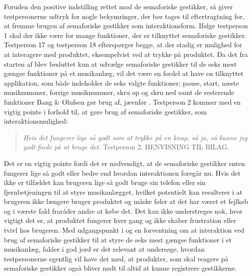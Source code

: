 Foruden den positive indstilling rettet mod de semaforiske gestikker, så giver testpersonerne udtryk for nogle bekymringer, der bør tages til eftertragtning for, at fremme brugen af semaforiske gestikker som interaktionsform. Ifølge testperson 1 skal der ikke være for mange funktioner, der er tilknyttet semaforiske gestikker. Testperson 17 og testperson 18 efterspørger begge, at der stadig er mulighed for at interagere med produktet, eksempelvist ved at trykke på produktet. Da det fra starten af blev besluttet kun at udvælge semaforiske gestikker til de seks mest gængse funktioner på et musikanlæg, vil det være en fordel at have en tilknyttet applikation, som både indeholder de seks valgte funktioner; pause, start, næste musiknummer, forrige musiknummer, skru op og skru ned samt de resterende funktioner Bang $\&$ Olufsen gør brug af, jævnfør .\blankline
% 
Testperson 2 kommer med en vigtig pointe i forhold til, at gøre brug af semaforiske gestikker, som interaktionsmulighed: 
%
\begin{quotation}
\textit{Hvis det fungerer lige så godt som at trykke på en knap, så ja, så kunne jeg godt finde på at bruge det.} Testperson 2, HENVISNING TIL BILAG. 
\end{quotation}
%
Det er en vigtig pointe fordi det er nødvendigt, at de semaforiske gestikker enten fungerer lige så godt eller bedre end hvordan interaktionen foregår nu. Hvis det ikke er tilfældet kan brugeren lige så godt bruge sin telefon eller sin fjernbetjeningen til at styre musikanlægget, hvilket potentielt kan resulterer i at brugeren ikke længere bruger produktet og måske føler at det har været et fejlkøb og i værste fald fraråder andre at købe det. Det kan ikke understreges nok, hvor vigtigt det er, at produktet fungerer hver gang og ikke skaber frustration eller tvivl hos brugeren. \blankline
%
Med udgangspunkt i og en forventning om at interaktion ved brug af semaforiske gestikker til at styre de seks mest gængse funktioner i et musikanlæg, falder i god jord er det relevant at undersøge, hvordan testpersonerne egentlig vil have det med, at produkter, som skal reagere på semaforiske gestikker også bliver nødt til altid at kunne registrere gestikkerne. 

  


